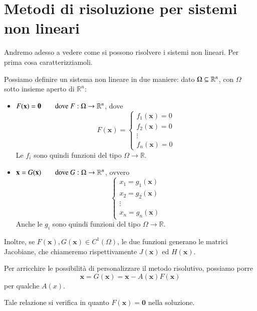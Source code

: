 


\inbpdocument 

\chapter{Metodi di risoluzione per sistemi non lineari}
Andremo adesso a vedere come si possono risolvere i sistemi non
lineari. Per prima cosa caratterizziamoli.

Possiamo definire un sistema non lineare in due maniere: dato $ \Omega
\subseteq \mathbb{R}^n $, con $\Omega$ sotto insieme aperto di $\mathbb{R}^{n}$:

\begin{itemize}
\item $ F(\mathbf{x}) = \mathbf{0} \qquad \text{dove } F:\Omega \rightarrow \mathbb{R}^n $,
  dove
\[ F(\mathbf{x}) = \left\lbrace \begin{array}{c}
f_1(\mathbf{x}) = 0 \\ f_2(\mathbf{x}) = 0 \\ \vdots \\ f_n(\mathbf{x}) = 0
\end{array}  \right. \]
Le $f_i$ sono quindi funzioni del tipo $\Omega \rightarrow \mathbb{R}$.
\item $ \mathbf{x} = G(\mathbf{x}) \qquad \text{dove } G:\Omega \rightarrow \mathbb{R}^n $,
  ovvero
\[ \left\lbrace \begin{array}{c}
x_1 = g_1(\mathbf{x}) \\ 
x_2 = g_2(\mathbf{x}) \\ 
\vdots \\ 
x_n = g_n(\mathbf{x})
\end{array}  \right. \]
Anche le $g_i$ sono quindi funzioni del tipo $\Omega \rightarrow \mathbb{R}$.

\end{itemize}

Inoltre, se $ F(\mathbf{x}),G(\mathbf{x}) \in C^1(\Omega) $, le due funzioni generano le matrici Jacobiane, che chiameremo rispettivamente $ J(\mathbf{x}) $ ed $ H(\mathbf{x})$.

Per arricchire le possibilit\`a di personalizzare il metodo
risolutivo, possiamo porre
 $$ \mathbf{x} = G(\mathbf{x}) = \mathbf{x} - A(\mathbf{x})F(\mathbf{x})$$
per qualche $A(x)$.

Tale relazione si verifica in quanto $F(\mathbf{x}) = \mathbf{0}$ nella soluzione.


